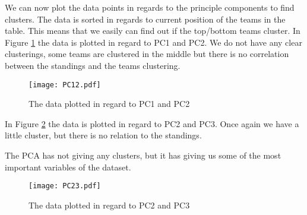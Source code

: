 \documentclass[Report.tex]{subfiles}
\begin{document}
We can now plot the data points in regards to the principle components to find clusters. The data is sorted in regards to current position of the teams in the table. This means that we easily can find out if the top/bottom teams cluster. In Figure \ref{fig:PC12} the data is plotted in regard to PC1 and PC2. We do not have any clear clusterings, some teams are clustered in the middle but there is no correlation between the standings and the teams clustering.

\begin{figure}
\center
\texttt{[image: PC12.pdf]}
\caption{The data plotted in regard to PC1 and PC2}
\label{fig:PC12}
\end{figure}
In Figure \ref{fig:PC23} the data is plotted in regard to PC2 and PC3. Once again we have a little cluster, but there is no relation to the standings.

The PCA has not giving any clusters, but it has giving us some of the most important variables of the dataset. 

\begin{figure}
\center
\texttt{[image: PC23.pdf]}
\caption{The data plotted in regard to PC2 and PC3}
\label{fig:PC23}
\end{figure}
\end{document}
